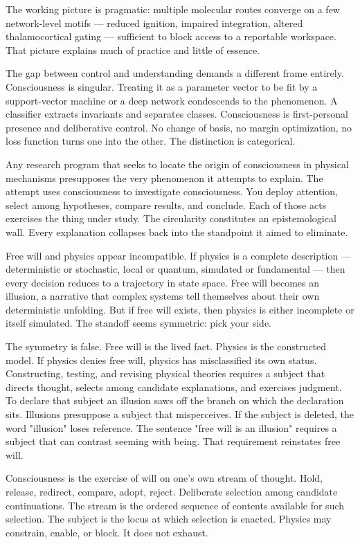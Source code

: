 The working picture is pragmatic: multiple molecular routes converge on a few network-level motifs — reduced ignition, impaired integration, altered thalamocortical gating — sufficient to block access to a reportable workspace. That picture explains much of practice and little of essence.

The gap between control and understanding demands a different frame entirely. Consciousness is singular. Treating it as a parameter vector to be fit by a support-vector machine or a deep network condescends to the phenomenon. A classifier extracts invariants and separates classes. Consciousness is first-personal presence and deliberative control. No change of basis, no margin optimization, no loss function turns one into the other. The distinction is categorical.

Any research program that seeks to locate the origin of consciousness in physical mechanisms presupposes the very phenomenon it attempts to explain. The attempt uses consciousness to investigate consciousness. You deploy attention, select among hypotheses, compare results, and conclude. Each of those acts exercises the thing under study. The circularity constitutes an epistemological wall. Every explanation collapses back into the standpoint it aimed to eliminate.

Free will and physics appear incompatible. If physics is a complete description — deterministic or stochastic, local or quantum, simulated or fundamental — then every decision reduces to a trajectory in state space. Free will becomes an illusion, a narrative that complex systems tell themselves about their own deterministic unfolding. But if free will exists, then physics is either incomplete or itself simulated. The standoff seems symmetric: pick your side.

The symmetry is false. Free will is the lived fact. Physics is the constructed model. If physics denies free will, physics has misclassified its own status. Constructing, testing, and revising physical theories requires a subject that directs thought, selects among candidate explanations, and exercises judgment. To declare that subject an illusion saws off the branch on which the declaration sits. Illusions presuppose a subject that misperceives. If the subject is deleted, the word "illusion" loses reference. The sentence "free will is an illusion" requires a subject that can contrast seeming with being. That requirement reinstates free will.

Consciousness is the exercise of will on one's own stream of thought. Hold, release, redirect, compare, adopt, reject. Deliberate selection among candidate continuations. The stream is the ordered sequence of contents available for such selection. The subject is the locus at which selection is enacted. Physics may constrain, enable, or block. It does not exhaust.

